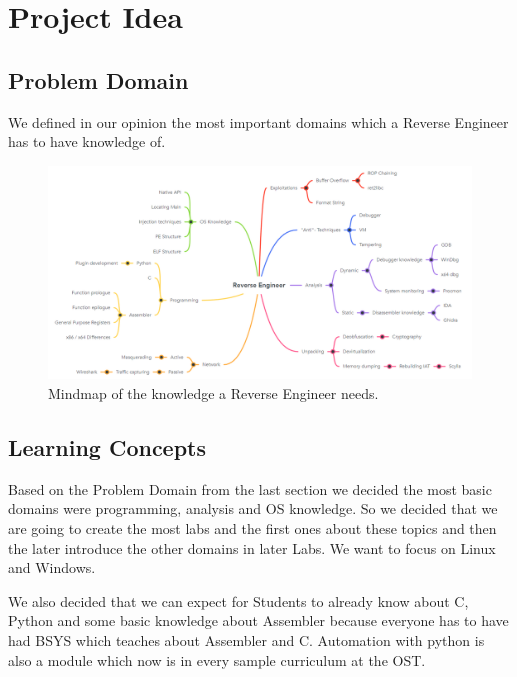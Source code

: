 \chapter{Project Idea}
\section{Problem Domain}
We defined in our opinion the most important domains which a Reverse Engineer has to have knowledge of.
\begin{figure}[H]
    \includegraphics[width=\linewidth, center]{resources/RE_Domain_Light.png}
    \caption{Mindmap of the knowledge a Reverse Engineer needs.}
    \label{fig:mindmap}
\end{figure}

\section{Learning Concepts}
Based on the Problem Domain from the last section we decided the most basic domains were programming, analysis and OS knowledge. So we decided that we are going to create the most labs and the first ones about these topics and then the later introduce the other domains in later Labs. We want to focus on Linux and Windows.

\noindent We also decided that we can expect for Students to already know about C, Python and some basic knowledge about Assembler because everyone has to have had BSYS which teaches about Assembler and C. Automation with python is also a module which now is in every sample curriculum at the OST.

